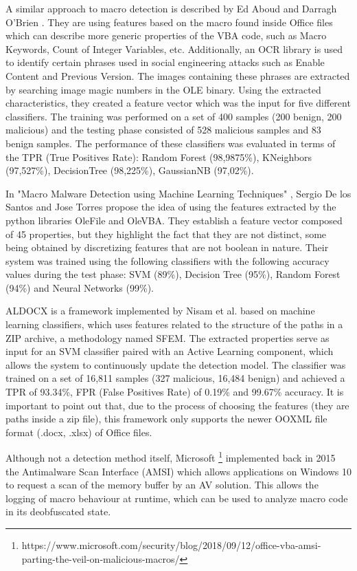 A similar approach to macro detection is described by Ed Aboud and Darragh O'Brien \cite{AboudO18}. They are using features based on the macro found inside Office files which can describe more generic properties of the VBA code, such as Macro Keywords, Count of Integer Variables, etc. Additionally, an OCR library is used to identify certain phrases used in social engineering attacks such as Enable Content and Previous Version. The images containing these phrases are extracted by searching image magic numbers in the OLE binary. Using the extracted characteristics, they created a feature vector which was the input for five different classifiers. The training was performed on a set of 400 samples (200 benign, 200 malicious) and the testing phase consisted of 528 malicious samples and 83 benign samples. The performance of these classifiers was evaluated in terms of the TPR (True Positives Rate): Random Forest (98,9875\%), KNeighbors (97,527\%), DecisionTree (98,225\%), GaussianNB (97,02\%).
\par
In "Macro Malware Detection using Machine Learning Techniques" \cite{SantosT17}, Sergio De los Santos and Jose Torres propose the idea of using the features extracted by the python libraries OleFile and OleVBA. They establish a feature vector composed of 45 properties, but they highlight the fact that they are not distinct, some being obtained by discretizing features that are not boolean in nature. Their system was trained  using the following classifiers with the following accuracy values during the test phase: SVM (89\%),  Decision Tree (95\%), Random Forest (94\%) and Neural Networks (99\%). 
\par
ALDOCX is a framework implemented by Nisam et al. \cite{NissimCE17} based on machine learning classifiers, which uses features related to the structure of the paths in a ZIP archive, a methodology named SFEM. The extracted properties serve as input for an SVM classifier paired with an Active Learning component, which allows the system to continuously update the detection model. The classifier was trained on a set of 16,811 samples (327 malicious, 16,484 benign) and achieved a TPR of 93.34\%, FPR (False Positives Rate) of 0.19\% and 99.67\% accuracy. It is important to point out that, due to the process of choosing the features (they are paths inside a zip file), this framework only supports the newer OOXML file format (.docx, .xlsx) of Office files.
\par
Although not a detection method itself, Microsoft \footnote{https://www.microsoft.com/security/blog/2018/09/12/office-vba-amsi-parting-the-veil-on-malicious-macros/} implemented back in 2015 the Antimalware Scan Interface (AMSI) which allows applications on Windows 10 to request a scan of the memory buffer by an AV solution. This allows the logging of macro behaviour at runtime, which can be used to analyze macro code in its deobfuscated state.
